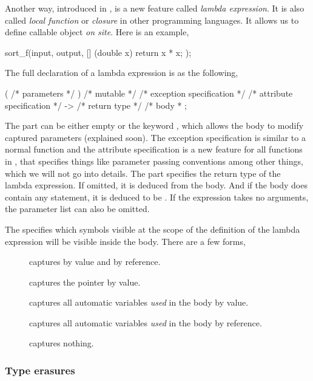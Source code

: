 Another way, introduced in \cppoo, is a new feature called \emph{lambda expression}. It is also called \emph{local function} or \emph{closure} in other programming languages. It allows us to define callable object \emph{on site}. Here is an example,
\begin{cppcode}
sort_f(input, output, [] (double x) { return x * x; });
\end{cppcode}
The full declaration of a lambda expression is as the following,
\begin{cppcode}
[ /* capture */ ] ( /* parameters */ ) /* mutable */
/* exception specification */
/* attribute specification */
-> /* return type */ { /* body * };
\end{cppcode}
The  part can be either empty or the keyword , which allows the body to modify captured parameters (explained soon). The exception specification is similar to a normal function and the attribute specification is a new feature for all functions in \cppoo, that specifies things like parameter passing conventions among other things, which we will not go into details. The part  specifies the return type of the lambda expression. If omitted, it is deduced from the body. And if the body does contain any  statement, it is deduced to be . If the expression takes no arguments, the parameter list can also be omitted.

The  specifies which symbols visible at the scope of the definition of the lambda expression will be visible inside the body. There are a few forms,
\begin{description}
  \item[\cppinline{[a, &b]}] captures  by value and  by reference.
  \item[\cppinline{[this]}] captures the  pointer by value.
  \item[\cppinline{[=]}] captures all automatic variables \emph{used} in the body by value.
  \item[\cppinline{[&]}] captures all automatic variables \emph{used} in the body by reference.
  \item[\cppinline{[]}] captures nothing.
\end{description}

\subsubsection{Type erasures}
\label{ssub:Type erasures}

